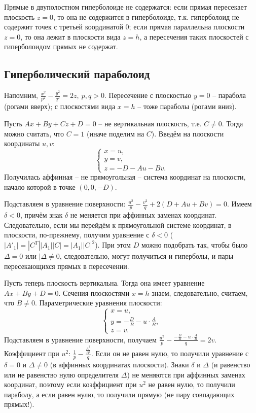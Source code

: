 \documentclass[a4paper, 12pt]{article}
\theoremstyle{definition}
\begin{document}
Прямые в двуполостном гиперболоиде не содержатся: если прямая пересекает плоскость $z = 0$, то она не содержится в гиперболоиде, т.к. гиперболоид не содержит точек с третьей координатой 0;
если прямая параллельна плоскости $z = 0$, то она лежит в плоскости вида $z = h$, а пересечения таких плоскостей с гиперболоидом прямых не содержат.


\subsection{Гиперболический параболоид}
Напомним, $\frac{x^2}{p^2} - \frac{y^2}{q^2} = 2z, \ p,q > 0$.
Пересечение с плоскостью $y=0$ – парабола (рогами вверх);
с плоскостями вида $x = h$ – тоже параболы (рогами вниз).

Пусть $Ax + By + Cz + D = 0$ – не вертикальная плоскость, т.е. $C \neq 0$.
Тогда можно считать, что $C = 1$ (иначе поделим на $C$).
Введём на плоскости координаты $u,v$:
\[\begin{cases}
    x = u, \\
    y = v, \\
    z = -D - Au - Bv.
\end{cases}\]
Получилась аффинная – не прямоугольная – система координат на плоскости, начало которой в точке $(0,0, -D)$.

Подставляем в уравнение поверхности: $\frac{u^2}{p} - \frac{v^2}{q} + 2(D + Au + Bv) = 0$. Имеем $\delta < 0$, причём знак $\delta$ не меняется при аффинных заменах координат.
Следовательно, если мы перейдём к прямоугольной системе координат, в плоскости, по-прежнему, получим уравнение с $\delta < 0$ ($|A'_1| = |C^T| |A_1| |C| = |A_1||C|^2$).
При этом $D$ можно подобрать так, чтобы было $\Delta = 0$ или $|\Delta \neq 0$, следовательно, могут получиться и гиперболы, и пары пересекающихся прямых в пересечении.

Пусть теперь плоскость вертикальна. Тогда она имеет уравнение $Ax + By + D = 0$.
Сечения плоскостями $x = h$ знаем, следовательно, считаем, что $B \neq 0$.
Параметрические уравнения плоскости:
\[\begin{cases}
    x = u, \\
    y = - \frac{D}{B} - u \cdot \frac{A}{B}, \\
    z = v.
\end{cases}\]
Подставляем в уравнение поверхности, получаем
$\frac{u^2}{p} - \frac{- \frac{D}{B} - u \cdot \frac{A}{B}}{q} = 2v$.
Коэффициент при $u^2$: $\frac{1}{p} - \frac{\frac{A^2}{B^2}}{q}$. Если он не равен нулю, то получили уравнение с $\delta = 0$ и $\Delta \neq 0$ (в аффинных координатах плоскости). Знаки $\delta$ и $\Delta$ (и равенство или не равенство нулю определителя $\Delta$) не меняются при аффинных заменах координат, поэтому если коэффициент при $u^2$ не равен нулю, то получили параболу, а если равен нулю, то получили прямую (не пару совпадающих прямых!).
\end{document}
